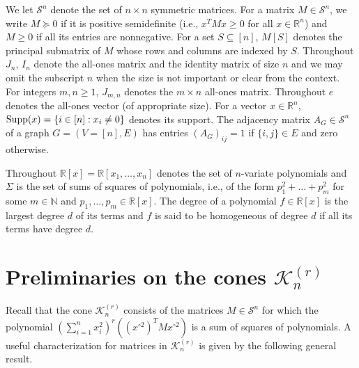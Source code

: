 \documentclass[11pt]{article}
\newcommand{\oN}{{\mathbb N}}
\newcommand{\oR}{{\mathbb R}}
\numberwithin{equation}{section}
\newcommand{\supp}{\text{\rm Supp}}
\newcommand{\MK}{{\mathcal K}}
\newcommand{\MS}{{\mathcal S}}
\begin{document}
We let $\mathcal S^n$ denote the set of $n\times n$ symmetric matrices. For a matrix $M\in \mathcal{S}^n$, we write $M\succeq 0$ if it is positive semidefinite (i.e., $x^TMx\ge 0$ for all $x\in\oR^n$) and $M\geq 0$ if all its entries are nonnegative. For a set $S\subseteq [n]$,  $M[S]$ denotes the principal submatrix of $M$ whose rows and columns are indexed by $S$. Throughout  $J_n$, $I_n$ denote the all-ones matrix and the identity matrix of size $n$ and we may omit the subscript $n$ when the size is not important or clear from the context. For integers $m,n\ge 1$,  $J_{m,n}$ denotes the $m\times n$ all-ones matrix. Throughout  $e$ denotes the all-ones vector (of appropriate size).
For a vector $x\in \mathbb{R}^n$, $\supp(x)=\{i\in [n] : x_i\ne 0\}$ denotes its support.  
The adjacency matrix $A_G\in \mathcal S^n$ of a graph $G=(V=[n],E)$ %
has entries $(A_G)_{ij}=1$ if $\{i,j\}\in E$ and zero otherwise.

Throughout $\oR[x]=\oR[x_1,\ldots,x_n]$ denotes the set of $n$-variate polynomials and $\Sigma$ is the set of sums of squares of polynomials, i.e.,  of the form $p_1^2+\ldots+p_m^2$ for some $m\in \oN$ and $p_1,\ldots,p_m\in \oR[x]$.
The degree of a polynomial $f\in \oR[x]$ is the largest degree $d$ of its terms and $f$ is said to be homogeneous of degree $d$ if all its terms have degree $d$.

\section{Preliminaries on the cones $\MK_n^{(r)}$}\label{preliminaries}


Recall that the cone $\MK_n^{(r)}$ consists of the matrices  $M\in \MS^n$ for which the polynomial $(\sum_{i=1}^{n}x_i^2)^r((x^{\circ2})^TMx^{\circ2})$ is a sum of squares of polynomials. A useful characterization for  matrices in $\MK_n^{(r)}$ is given by the following general result.  
\end{document}
